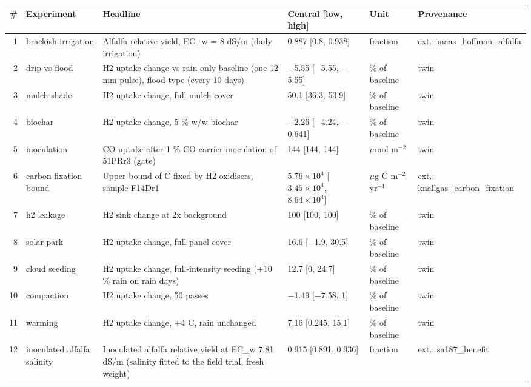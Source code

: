 \begin{tabular}{@{}rp{2.1cm}p{4.4cm}p{3.3cm}p{2cm}p{2.3cm}@{}}
\toprule
\# & Experiment & Headline & Central [low, high] & Unit & Provenance \\
\midrule
1 & brackish irrigation & Alfalfa relative yield, EC\_w = 8 dS/m (daily irrigation) & 0.887 [0.8, 0.938] & fraction & ext.: maas\_hoffman\_alfalfa \\
2 & drip vs flood & H2 uptake change vs rain-only baseline (one 12 mm pulse), flood-type (every 10 days) & $-$5.55 [$-$5.55, $-$5.55] & \% of baseline & twin \\
3 & mulch shade & H2 uptake change, full mulch cover & 50.1 [36.3, 53.9] & \% of baseline & twin \\
4 & biochar & H2 uptake change, 5 \% w/w biochar & $-$2.26 [$-$4.24, $-$0.641] & \% of baseline & twin \\
5 & inoculation & CO uptake after 1 \% CO-carrier inoculation of 51PRr3 (gate) & 144 [144, 144] & $\mu$mol m$^{-2}$ & twin \\
6 & carbon fixation bound & Upper bound of C fixed by H2 oxidisers, sample F14Dr1 & $5.76\times10^{4}$ [$3.45\times10^{4}$, $8.64\times10^{4}$] & $\mu$g C m$^{-2}$ yr$^{-1}$ & ext.: knallgas\_carbon\_fixation \\
7 & h2 leakage & H2 sink change at 2x background & 100 [100, 100] & \% of baseline & twin \\
8 & solar park & H2 uptake change, full panel cover & 16.6 [$-$1.9, 30.5] & \% of baseline & twin \\
9 & cloud seeding & H2 uptake change, full-intensity seeding (+10 \% rain on rain days) & 12.7 [0, 24.7] & \% of baseline & twin \\
10 & compaction & H2 uptake change, 50 passes & $-$1.49 [$-$7.58, 1] & \% of baseline & twin \\
11 & warming & H2 uptake change, +4 C, rain unchanged & 7.16 [0.245, 15.1] & \% of baseline & twin \\
12 & inoculated alfalfa salinity & Inoculated alfalfa relative yield at EC\_w 7.81 dS/m (salinity fitted to the field trial, fresh weight) & 0.915 [0.891, 0.936] & fraction & ext.: sa187\_benefit \\
\bottomrule
\end{tabular}
